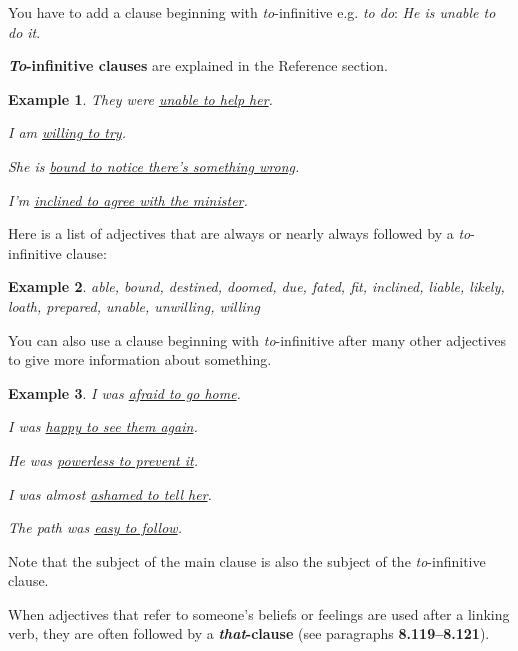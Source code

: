 \documentclass[oneside]{book}
\numberwithin{equation}{section}
\newtheorem{example}{Example}[section]
\begin{document}
You have to add a clause beginning with \textit{to}-infinitive e.g. \textit{to do}: \textit{He is unable to do it}.

\textbf{\textit{To}-infinitive clauses} are explained in the Reference section.
\begin{example}
    They were \underline{unable to help her}.
    
    I am \underline{willing to try}.
    
    She is \underline{bound to notice there's something wrong}.
    
    I'm \underline{inclined to agree with the minister}.
\end{example}
Here is a list of adjectives that are always or nearly always followed by a \textit{to}-infinitive clause:
\begin{example}
    able, bound, destined, doomed, due, fated, fit, inclined, liable, likely, loath, prepared, unable, unwilling, willing
\end{example}
%
\noindent{} You can also use a clause beginning with \textit{to}-infinitive after many other adjectives to give more information about something.
\begin{example}
    I was \underline{afraid to go home}.
    
    I was \underline{happy to see them again}.
    
    He was \underline{powerless to prevent it}.
    
    I was almost \underline{ashamed to tell her}.
    
    The path was \underline{easy to follow}.
\end{example}
Note that the subject of the main clause is also the subject of the \textit{to}-infinitive clause.

%
\noindent{} When adjectives that refer to someone's beliefs or feelings are used after a linking verb, they are often followed by a \textbf{\textit{that}-clause} (see paragraphs \textbf{8.119--8.121}).
\end{document}
